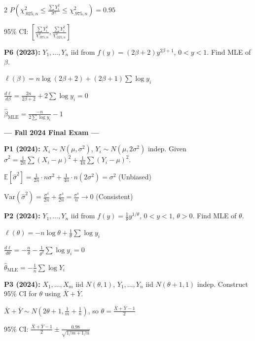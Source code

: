 \documentclass[10pt,letterpaper]{article}
\newcommand{\Var}{\text{Var}}
\newcommand{\E}{\mathbb{E}}
\begin{document}
\begin{multicols}{2}
$P\!\left(\chi^2_{.025,n} \le \frac{\sum Y_i^2}{\sigma^2} \le \chi^2_{.975,n}\right) = 0.95$

95\% CI: $\boxed{\left[\frac{\sum Y_i^2}{\chi^2_{.975,n}}, \frac{\sum Y_i^2}{\chi^2_{.025,n}}\right]}$

\textbf{P6 (2023):} $Y_1, \ldots, Y_n$ iid from $f(y) = (2\beta+2)y^{2\beta+1}$, $0 < y < 1$. Find MLE of $\beta$.

$\ell(\beta) = n\log(2\beta+2) + (2\beta+1)\sum \log y_i$

$\frac{d\ell}{d\beta} = \frac{2n}{2\beta+2} + 2\sum \log y_i = 0$

$\boxed{\hat{\beta}_{\text{MLE}} = \frac{-n}{2\sum \log y_i} - 1}$

\vspace{2mm}


\begin{center}
\textbf{--- Fall 2024 Final Exam ---}
\end{center}

\vspace{1mm}

\textbf{P1 (2024):} $X_i \sim N(\mu, \sigma^2)$, $Y_i \sim N(\mu, 2\sigma^2)$ indep. Given $\hat{\sigma}^2 = \frac{1}{2n}\sum(X_i-\mu)^2 + \frac{1}{4n}\sum(Y_i-\mu)^2$.

$\E[\hat{\sigma}^2] = \frac{1}{2n} \cdot n\sigma^2 + \frac{1}{4n} \cdot n(2\sigma^2) = \sigma^2$ (Unbiased)

$\Var(\hat{\sigma}^2) = \frac{\sigma^4}{2n} + \frac{\sigma^4}{2n} = \frac{\sigma^4}{n} \to 0$ (Consistent)

\textbf{P2 (2024):} $Y_1, \ldots, Y_n$ iid from $f(y) = \frac{1}{\theta}y^{1/\theta}$, $0 < y < 1$, $\theta > 0$. Find MLE of $\theta$.

$\ell(\theta) = -n\log\theta + \frac{1}{\theta}\sum \log y_i$

$\frac{d\ell}{d\theta} = -\frac{n}{\theta} - \frac{1}{\theta^2}\sum \log y_i = 0$

$\boxed{\hat{\theta}_{\text{MLE}} = -\frac{1}{n}\sum \log Y_i}$

\textbf{P3 (2024):} $X_1, \ldots, X_m$ iid $N(\theta, 1)$, $Y_1, \ldots, Y_n$ iid $N(\theta+1, 1)$ indep. Construct 95\% CI for $\theta$ using $\bar{X} + \bar{Y}$.

$\bar{X} + \bar{Y} \sim N\left(2\theta+1, \frac{1}{m}+\frac{1}{n}\right)$, so $\theta = \frac{\bar{X}+\bar{Y}-1}{2}$

95\% CI: $\boxed{\frac{\bar{X}+\bar{Y}-1}{2} \pm \frac{0.98}{\sqrt{1/m+1/n}}}$


\end{multicols}
\end{document}
